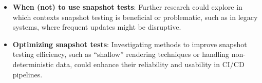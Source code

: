 \documentclass[
	msc, %
	english %
]{../ppgccufmg}
\begin{document}
\begin{itemize}
          \item \textbf{When (not) to use snapshot tests}: Further research could explore in which contexts snapshot testing is beneficial or problematic, such as in legacy systems, where frequent updates might be disruptive.
          \item \textbf{Optimizing snapshot tests}: Investigating methods to improve snapshot testing efficiency, such as “shallow” rendering techniques or handling non-deterministic data, could enhance their reliability and usability in CI/CD pipelines.
          
        \end{itemize}
        
		\renewcommand\bibname{References} %
		
		
		
\end{document}
